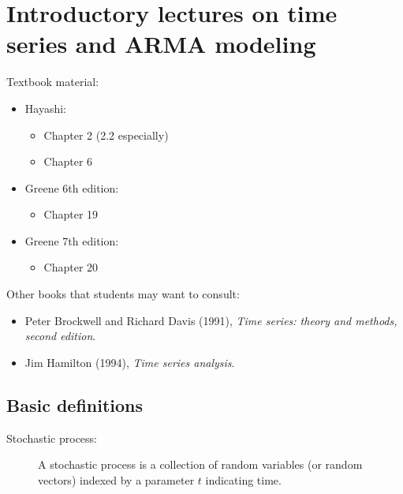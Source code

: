 
\chapter{Introductory lectures on time series and ARMA modeling}

Textbook material:
\begin{itemize}
\item Hayashi:
  \begin{itemize}
  \item Chapter 2 (2.2 especially)
  \item Chapter 6
  \end{itemize}
\item Greene 6th edition:
  \begin{itemize}
  \item Chapter 19
  \end{itemize}
\item Greene 7th edition:
  \begin{itemize}
  \item Chapter 20
  \end{itemize}
\end{itemize}

Other books that students may want to consult:
\begin{itemize}
\item Peter Brockwell and Richard Davis (1991), \emph{Time series:
    theory and methods, second edition}.
\item Jim Hamilton (1994), \emph{Time series analysis}.
\end{itemize}

\section{Basic definitions}

\begin{description}
\item[Stochastic process:]
A stochastic process is a collection of random variables (or
random vectors) indexed by a parameter $t$ indicating time.
\end{description}

